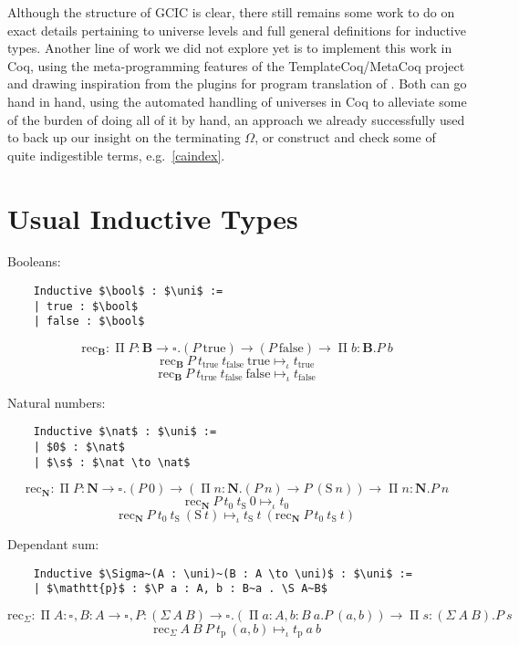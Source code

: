 \documentclass{kaobook}
\renewcommand{\mathtt}{\mathrm}
\newcommand{\uni}[1][]{\square_{#1}}
\newcommand{\red}{\mapsto}
\newcommand{\ired}{\red_\iota}
\renewcommand{\P}{\operatorname{\Pi}}
\renewcommand{\S}{\operatorname{\Sigma}}
\DeclareMathOperator{\?}{?}
\newcommand{\rec}{\mathtt{rec}}
\newcommand{\bool}{\mathbf{B}}
\newcommand{\nat}{\mathbf{N}}
\newcommand{\s}{\mathtt{S}}
\newcommand{\true}{\mathtt{true}}
\newcommand{\false}{\mathtt{false}}
\begin{document}
{Although the structure of GCIC is clear, there still remains some work to do on exact details pertaining to universe levels and full general definitions for inductive types. Another line of work we did not explore yet is to implement this work in Coq, using the meta-programming features of the TemplateCoq/MetaCoq project \cite{Anand2018} and drawing inspiration from the plugins for program translation of \cite{Boulier2017,Pedrot2018}. Both can go hand in hand, using the automated handling of universes in Coq to alleviate some of the burden of doing all of it by hand, an approach we already successfully used to back up our insight on the terminating $\Omega$, or construct and check some of quite indigestible terms, e.g.\ \autoref{caindex}.

{}
\printbibliography

\newpage
{}
\appendix
\appendixpage
\addappheadtotoc
{}

\section{Usual Inductive Types}
\label{indtyex}

	Booleans:
	\begin{lstlisting}
	Inductive $\bool$ : $\uni$ :=
	| true : $\bool$
	| false : $\bool$
	\end{lstlisting}
	\[\rec_{\bool} : \P P : \bool \to \uni. (P~\true) \to (P~\false) \to \P b : \bool. P~b\]
	\[\rec_{\bool}~P~t_{\true}~t_{\false}~\true \ired t_{\true}\]
	\[\rec_{\bool}~P~t_{\true}~t_{\false}~\false \ired t_{\false}\]
	
	Natural numbers:
	\begin{lstlisting}
	Inductive $\nat$ : $\uni$ :=
	| $0$ : $\nat$
	| $\s$ : $\nat \to \nat$
	\end{lstlisting}
	\[\rec_{\nat} : \P P : \nat \to \uni. (P~0) \to (\P n : \nat. (P~n) \to P~(\s~n)) \to \P n : \nat. P~n \]
	\[\rec_{\nat}~P~t_0~t_\s~0 \ired t_0\]
	\[\rec_{\nat}~P~t_0~t_\s~(\s~t) \ired t_\s~t~(\rec_{\nat}~P~t_0~t_\s~t)\]
	
	Dependant sum:
	\begin{lstlisting}
	Inductive $\Sigma~(A : \uni)~(B : A \to \uni)$ : $\uni$ :=
	| $\mathtt{p}$ : $\P a : A, b : B~a . \S A~B$
	\end{lstlisting}
	\[\rec_{\Sigma} : \P A : \uni, B : A \to \uni, P : (\Sigma~A~B) \to \uni. (\P a : A, b : B~a. P~(a,b)) \to \P s : (\Sigma~A~B). P~s \]
	\[\rec_{\Sigma}~A~B~P~t_{\mathtt{p}}~(a,b) \ired t_{\mathtt{p}}~a~b \]
	
}
\end{document}
